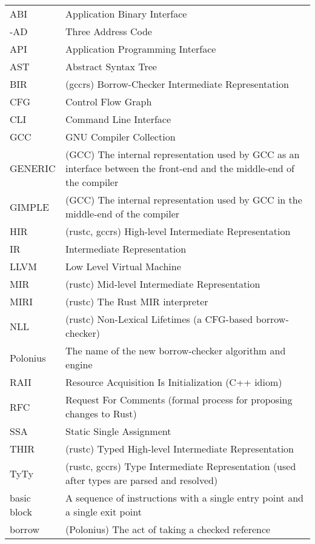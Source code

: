 \documentclass[
  11pt,
  twoside,symmetric]{report}
\begin{document}
\begin{longtable}[]{@{}
  >{\raggedright\arraybackslash}p{}
  >{\raggedright\arraybackslash}p{}@{}}
\toprule\noalign{}
\endhead
\bottomrule\noalign{}
\endlastfoot
ABI & Application Binary Interface \\
3-AD & Three Address Code \\
API & Application Programming Interface \\
AST & Abstract Syntax Tree \\
BIR & (gccrs) Borrow-Checker Intermediate Representation \\
CFG & Control Flow Graph \\
CLI & Command Line Interface \\
GCC & GNU Compiler Collection \\
GENERIC & (GCC) The internal representation used by GCC as an interface
between the front-end and the middle-end of the compiler \\
GIMPLE & (GCC) The internal representation used by GCC in the middle-end
of the compiler \\
HIR & (rustc, gccrs) High-level Intermediate Representation \\
IR & Intermediate Representation \\
LLVM & Low Level Virtual Machine \\
MIR & (rustc) Mid-level Intermediate Representation \\
MIRI & (rustc) The Rust MIR interpreter \\
NLL & (rustc) Non-Lexical Lifetimes (a CFG-based borrow-checker) \\
Polonius & The name of the new borrow-checker algorithm and engine \\
RAII & Resource Acquisition Is Initialization (C++ idiom) \\
RFC & Request For Comments (formal process for proposing changes to
Rust) \\
SSA & Static Single Assignment \\
THIR & (rustc) Typed High-level Intermediate Representation \\
TyTy & (rustc, gccrs) Type Intermediate Representation (used after types
are parsed and resolved) \\
basic block & A sequence of instructions with a single entry point and a
single exit point \\
borrow & (Polonius) The act of taking a checked reference \\

\end{longtable}
\end{document}

